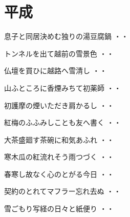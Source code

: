 \chapter{平成}
\begin{shiika}息子と同居決めむ独りの湯豆腐鍋
\hfill{・・}\end{shiika}
\vspace{0.6cm}
\begin{shiika}トンネルを出て越前の雪景色
\hfill{・・}\end{shiika}
\vspace{0.6cm}
\begin{shiika}仏壇を買ひに越路へ雪清し
\hfill{・・}\end{shiika}
\vspace{0.6cm}
\begin{shiika}山ふところに香煙みちて初薬師
\hfill{・・}\end{shiika}
\vspace{0.6cm}
\begin{shiika}初護摩の煙いただき肩かるし
\hfill{・・}\end{shiika}
\vspace{0.6cm}
\begin{shiika}紅梅のふふみしことも友へ書く
\hfill{・・}\end{shiika}
\vspace{0.6cm}
\begin{shiika}大茶盛廻す茶碗に和気あふれ
\hfill{・・}\end{shiika}
\vspace{0.6cm}
\begin{shiika}寒木瓜の紅流れそう雨つづく
\hfill{・・}\end{shiika}
\vspace{0.6cm}
\begin{shiika}春寒し故なく心のとがる今日
\hfill{・・}\end{shiika}
\vspace{0.6cm}
\begin{shiika}契約のとれてマフラー忘れ去ぬ
\hfill{・・}\end{shiika}
\vspace{0.6cm}
\begin{shiika}雪ごもり写経の日々と紙便り
\hfill{・・}\end{shiika}
